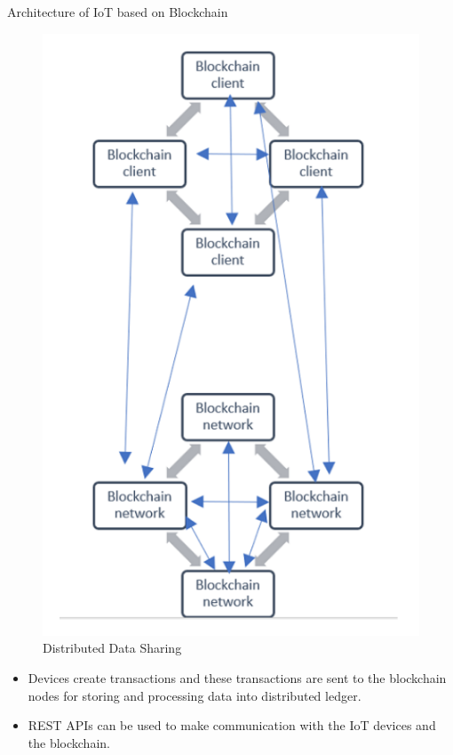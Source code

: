 \documentclass{beamer}
\begin{document}
\begin{frame}{Architecture of IoT based on Blockchain \cite{sw_hw_sec_2021}}

\begin{minipage}{0.5\textwidth}
        \begin{figure}
            \centering
            \includegraphics[width=0.7\linewidth]{pic/distributed_data_sharing.png}
            \caption{Distributed Data Sharing}
            \label{fig:distributed-data-sharing-2}
        \end{figure}
\end{minipage}%
\begin{minipage}{0.5\textwidth}
    \centering
    \begin{itemize}
        \item {Devices create transactions and these transactions are sent to the blockchain nodes for storing and processing data into distributed ledger.}
        \item {REST APIs can be used to make communication with the IoT devices and the blockchain.}
    \end{itemize}
\end{minipage}
\end{frame}
\end{document}
